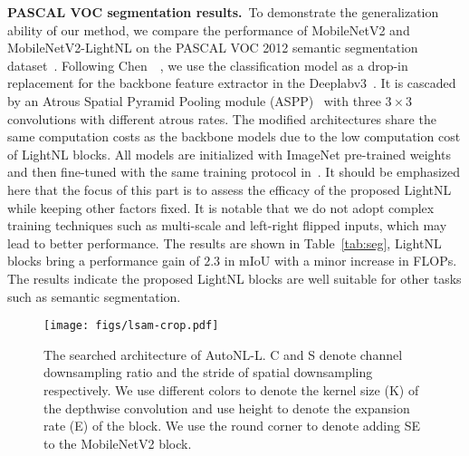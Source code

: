 \documentclass[10pt,twocolumn,letterpaper]{article}
\begin{document}
\vspace{0.5ex}\noindent\textbf{PASCAL VOC segmentation results.}~To demonstrate the generalization ability of our method, we compare the performance of MobileNetV2 and MobileNetV2-LightNL on the PASCAL VOC 2012 semantic segmentation dataset~\cite{everingham2015pascal}.
Following Chen~\etal~\cite{chen2019renas}, we use the classification model as a drop-in replacement for the backbone feature extractor in the Deeplabv3~\cite{chen2017rethinking}. It is cascaded by an Atrous Spatial Pyramid Pooling module (ASPP)~\cite{chen2017deeplab} with three $3\times3$ convolutions with different atrous rates. The modified architectures share the same computation costs as the backbone models due to the low computation cost of LightNL blocks. All models are initialized with ImageNet pre-trained weights and then fine-tuned with the same training protocol in~\cite{chen2017deeplab}. 
It should be emphasized here that the focus of this part is to assess the efficacy of the proposed LightNL while keeping other factors fixed. It is notable that we do not adopt complex training techniques such as multi-scale and left-right flipped inputs, which may lead to better performance. The results are shown in Table~\ref{tab:seg}, LightNL blocks bring a performance gain of $2.3$ in mIoU with a minor increase in FLOPs.
The results indicate the proposed LightNL blocks are well suitable for other tasks such as semantic segmentation.

\begin{figure*}[tb]
    \centering
    \texttt{[image: figs/lsam-crop.pdf]}
    \caption{The searched architecture of AutoNL-L. C and S denote channel downsampling ratio and the stride of spatial downsampling respectively. We use different colors to denote the kernel size (K) of the depthwise convolution and use height to denote the expansion rate (E) of the block. We use the round corner to denote adding SE~\cite{hu2018se} to the MobileNetV2 block.}
    \label{fig:atomnas_m_arch}
    \vspace{-1.5em}
\end{figure*}
\end{document}
